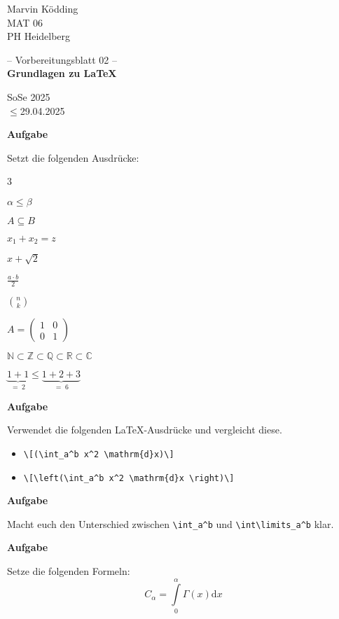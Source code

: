 \documentclass[a4paper, 12pt]{article}
\renewcommand{\date}{$\leq$29.04.2025}
\newcommand{\klasse}{MAT 06}
\newcommand{\institute}{PH Heidelberg}
\newcommand{\topic}{Grundlagen zu \LaTeX}
\newcommand{\semester}{SoSe 2025}
\newcommand{\blatt}{02}
\newcounter{Aufgabe}
\newenvironment{aufgabe}{\addtocounter{Aufgabe}{1}%
	\textbf{Aufgabe \theAufgabe}
	
	\vspace*{-0.3em}}{\medskip}
\begin{document}
	\pagestyle{empty}
	\begin{minipage}{0.2\textwidth}
		Marvin Ködding\\\scriptsize \klasse\\\institute
	\end{minipage}
	\begin{minipage}{.6\textwidth}
		\centering
		-- Vorbereitungsblatt \blatt{} --\\\textbf{\topic}
	\end{minipage}
	\begin{minipage}{.2\textwidth}
		\flushright \semester\\\scriptsize \date
	\end{minipage}
	
	\vspace*{1cm}
	
	\begin{aufgabe}
		Setzt die folgenden Ausdrücke:
		\begin{enumerate}
		\end{enumerate}
	\end{aufgabe}
	
	\begin{aufgabe}
		Verwendet die folgenden \LaTeX{}-Ausdrücke und vergleicht diese.
		\begin{itemize}
			\item \verb|\[(\int_a^b x^2 \mathrm{d}x)\]|
			\item \verb|\[\left(\int_a^b x^2 \mathrm{d}x \right)\]|
		\end{itemize}
	\end{aufgabe}
	
	\begin{aufgabe}
		Macht euch den Unterschied zwischen \verb+\int_a^b+ und \verb+\int\limits_a^b+ klar.
	\end{aufgabe}
	
	\begin{aufgabe}
		Setze die folgenden Formeln:
		$$C_{\alpha}=\int\limits_0^{\alpha} \Gamma(x) \mathrm{d}x$$
	\end{aufgabe}
	
	
\end{document}

